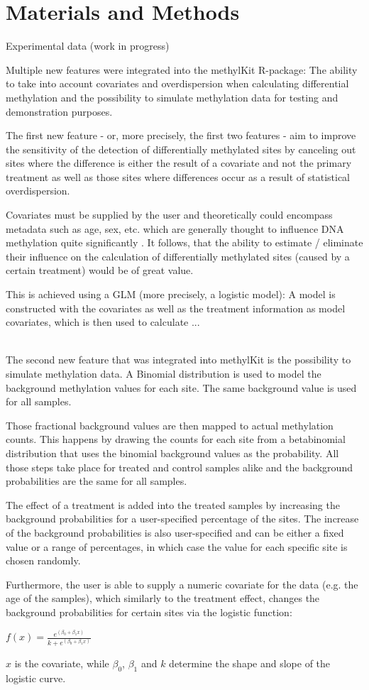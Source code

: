 \section{Materials and Methods}

Experimental data (work in progress)

Multiple new features were integrated into the methylKit R-package: The ability to take into account covariates and overdispersion when calculating differential methylation and the possibility to simulate methylation data for testing and demonstration purposes.

The first new feature - or, more precisely, the first two features - aim to  improve the sensitivity of the detection of differentially methylated sites by canceling out sites where the difference is either the result of a covariate and not the primary treatment as well as those sites where differences occur as a result of statistical overdispersion.

Covariates must be supplied by the user and theoretically could encompass metadata such as age, sex, etc. which are generally thought to influence DNA methylation quite significantly \cite{24561809}. It follows, that the ability to estimate / eliminate their influence on the calculation of differentially methylated sites (caused by a certain treatment) would be of great value.

This is achieved using a GLM (more precisely, a logistic model): A model is constructed with the covariates as well as the treatment information as model covariates, which is then used to calculate ...

\\
The second new feature that was integrated into methylKit is the possibility to simulate methylation data.
A Binomial distribution is used to model the background methylation values for each site. The same background value is used for all samples.

Those fractional background values are then mapped to actual methylation counts. This happens by drawing the counts for each site from a betabinomial distribution that uses the binomial background values as the probability.
All those steps take place for treated and control samples alike and the background probabilities are the same for all samples.

The effect of a treatment is added into the treated samples by increasing the background probabilities for a user-specified percentage of the sites. The increase of the background probabilities is also user-specified and can be either a fixed value or a range of percentages, in which case the value for each specific site is chosen randomly.

Furthermore, the user is able to supply a numeric covariate for the data (e.g. the age of the samples), which similarly to the treatment effect, changes the background probabilities for certain sites via the logistic function:

$f(x) = \frac{e^{(\beta_{0} + \beta_{1}x)}}{k+e^{(\beta_{0} + \beta_{1}x)}}$

$x$ is the covariate, while $\beta_{0}$, $\beta_{1}$ and $k$ determine the shape and slope of the logistic curve.
  